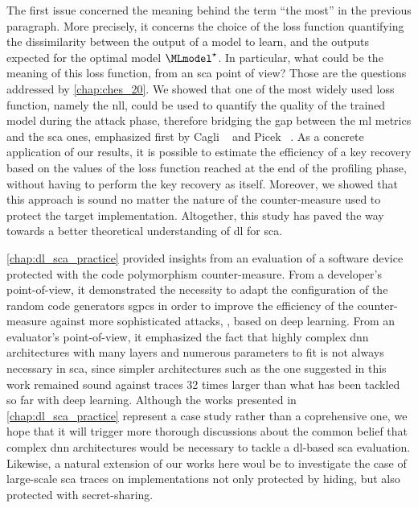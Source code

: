 	The first issue concerned the meaning behind the term ``the most'' in the previous paragraph.
	More precisely, it concerns the choice of the loss function quantifying the dissimilarity between the output of a model to learn, and the outputs expected for the optimal model \(\MLmodel^\star\).
	In particular, what could be the meaning of this loss function, from an \gls{sca} point of view?
	Those are the questions addressed by \autoref{chap:ches_20}.
	We showed that one of the most widely used loss function, namely the \gls{nll}, could be used to quantify the quality of the trained model during the attack phase, therefore bridging the gap between the \gls{ml} metrics and the \gls{sca} ones, emphasized first by Cagli \etal{}~\cite{cagli_convolutional_2017} and Picek \etal{}~\cite{picek_curse_2019}.
	As a concrete application of our results, it is possible to estimate the efficiency of a key recovery based on the values of the loss function reached at the end of the profiling phase, without having to perform the key recovery as itself.
	Moreover, we showed that this approach is sound no matter the nature of the counter-measure used to protect the target implementation.
	Altogether, this study has paved the way towards a better theoretical understanding of \gls{dl} for \gls{sca}.

	\autoref{chap:dl_sca_practice} provided insights from an evaluation of a software device protected with the code polymorphism counter-measure.
	From a developer's point-of-view, it demonstrated the necessity to adapt the configuration of the random code generators \aka{} \glspl{sgpc} in order to improve the efficiency of the counter-measure against more sophisticated attacks, \eg{}, based on deep learning.
	From an evaluator's point-of-view, it emphasized the fact that highly complex \gls{dnn} architectures with many layers and numerous parameters to fit is not always necessary in \gls{sca}, since simpler architectures such as the one suggested in this work remained sound against traces 32 times larger than what has been tackled so far with deep learning.
	Although the works presented in \autoref{chap:dl_sca_practice} represent a case study rather than a coprehensive one, we hope that it will trigger more thorough discussions about the common belief that complex \gls{dnn} architectures would be necessary to tackle a \gls{dl}-based \gls{sca} evaluation.
	Likewise, a natural extension of our works here woul be to investigate the case of large-scale \gls{sca} traces on implementations not only protected by hiding, but also protected with secret-sharing.

